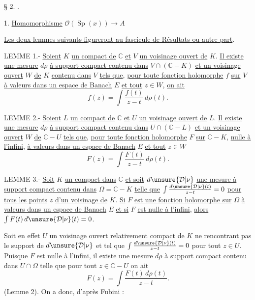 
§ 2. .

1. \uline{Homomorphisme} $\mathcal O(\operatorname{Sp}(x))\longrightarrow A$

\uline{Les deux lemmes suivants figureront au fascicule de Résultats ou autre part}.

LEMME 1.- \uline{Soient} $K$ \uline{un compact de} $\mathbb C$ \uline{et} $V$ \uline{un voisinage ouvert de} $K$. \uline{Il existe une mesure} $d\rho$ \uline{à support compact contenu dans} $V\cap(\mathbb C-K)$ \uline{et un voisinage ouvert} $W$ \uline{de} $K$ \uline{contenu dans} $V$ \uline{tels que}, \uline{pour toute fonction holomorphe} $f$ \uline{sur} $V$ \uline{à valeurs dans un espace de Banach} $E$ \uline{et tout} $z\in W$, \uline{on ait}
\[
f(z)=\int\frac{f(t)}{z-t}\,d\rho(t).
\]

LEMME 2.- \uline{Soient} $L$ \uline{un compact de} $\mathbb C$ \uline{et} $U$ \uline{un voisinage ouvert de} $L$. \uline{Il existe une mesure} $d\rho$ \uline{à support compact contenu dans} $U\cap(\mathbb C-L)$ \uline{et un voisinage ouvert} $W$ \uline{de} $\mathbb C-U$ \uline{tels que}, \uline{pour toute fonction holomorphe} $F$ \uline{sur} $\mathbb C-K$, \uline{nulle à l'infini}, \uline{à valeurs dans un espace de Banach} $E$ \uline{et tout} $z\in W$
\[
F(z)=\int\frac{F(t)}{z-t}\,d\rho(t).
\]

LEMME 3.- \uline{Soit} $K$ \uline{un compact dans} $\mathbb C$ \uline{et soit} $d\unsure{\mathcal D|\nu}$ \uline{une mesure à support compact contenu dans} $\Omega=\mathbb C-K$ \uline{telle que} $\int\frac{d\unsure{\mathcal D|\nu}(t)}{z-t}=0$ \uline{pour tous les points} $z$ \uline{d'un voisinage de} $K$. \uline{Si} $F$ \uline{est une fonction holomorphe sur} $\Omega$ \uline{à valeurs dans un espace de Banach} $E$ \uline{et si} $F$ \uline{est nulle à l'infini}, \uline{alors} $\int F(t)\,d\unsure{\mathcal D|\nu}(t)=0$.

Soit en effet $U$ un voisinage ouvert relativement compact de $K$ ne rencontrant pas le support de $d\unsure{\mathcal D|\nu}$ et tel que $\int\frac{d\unsure{\mathcal D|\nu}(t)}{z-t}=0$ pour tout $z\in U$. Puisque $F$ est nulle à l'infini, il existe une mesure $d\rho$ à support compact contenu dans $U\cap\Omega$ telle que pour tout $z\in\mathbb C-U$ on ait
\[
F(z)=\int\frac{F(t)\,d\rho(t)}{z-t}.
\]
(Lemme 2). On a donc, d'après Fubini :

